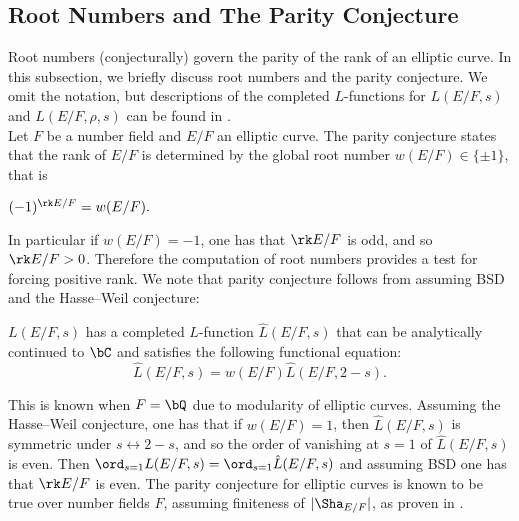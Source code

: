 \subsection{Root Numbers and The Parity Conjecture}\label{sec_parity}

Root numbers (conjecturally) govern the parity of the rank of an elliptic curve. In this subsection, we briefly discuss root numbers and the parity conjecture. %
We omit the notation, but descriptions of the completed $L$-functions for $L(E / F, s)$ and $L(E / F, \rho, s)$ can be found in \cite[$\S$2.5]{DEW1}.\\


Let $F$ be a number field and $E / F$ an elliptic curve. The parity conjecture states that the rank of $E / F$ is determined by the global root number $w(E / F) \in \{ \pm 1 \}$, that is

\begin{conj}\label{parity}
    $(-1)^{\rk E / F} = w(E / F).$
\end{conj}

In particular if $w(E / F) = -1$, one has that $\rk E / F$ is odd, and so $\rk E / F > 0$. Therefore the computation of root numbers provides a test for forcing positive rank. We note that parity conjecture follows from assuming BSD and the Hasse--Weil conjecture: 

\begin{conj}\label{conj_hasseweil}
    $L(E / F, s)$ has a completed $L$-function 
    $\hat{L}(E / F, s)$ that can be analytically continued to $\bC$ and satisfies the following functional equation:
    \[ \hat{L}(E / F, s) = w(E / F) \hat{L}(E / F, 2- s) .\]
\end{conj}

This is known when $F = \bQ$ due to modularity of elliptic curves. Assuming the Hasse--Weil conjecture, one has that if $w(E / F) = 1$, then $\hat{L}(E / F, s)$ is symmetric under $s \leftrightarrow 2 - s$, and so the order of vanishing at $s = 1$ of $\hat{L}(E / F, s)$ is even. Then $\ord_{s = 1} L(E / F, s) = \ord_{s = 1}\hat{L}(E / F, s)$ and assuming BSD one has that $\rk E / F$ is even. 
The parity conjecture for elliptic curves is known to be true over number fields $F$, assuming finiteness of $|\Sha_{E / F}|$, as proven in \cite{TimVlad}.

